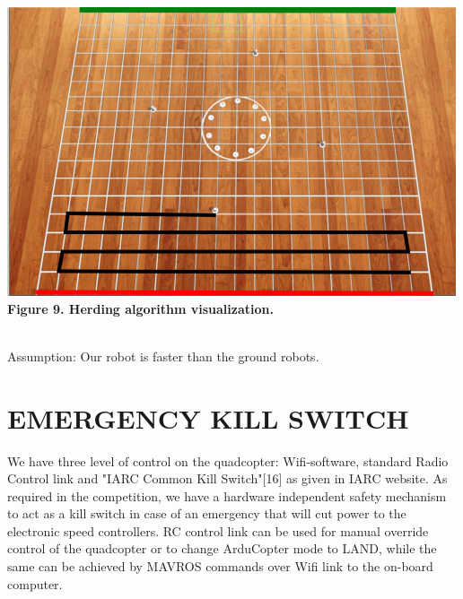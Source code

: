 \documentclass[12pt]{article}
\begin{document}
\begin{center}\includegraphics[scale=0.7]{image28} \\
\textbf{Figure 9. Herding algorithm visualization.}\end{center}\\
Assumption: Our robot is faster than the ground robots.

\section{EMERGENCY KILL SWITCH}
We have three level of control on the quadcopter: Wifi-software, standard Radio Control link and "IARC Common Kill Switch"[16] as given in IARC website.
As required in the competition, we have a hardware independent safety mechanism to act as a kill switch in case of an emergency that will cut power
to the electronic speed controllers. RC control link can be used for manual override control of the quadcopter or to change ArduCopter mode to LAND, while the same can be achieved by MAVROS commands over Wifi link to the on-board computer. 
\end{document}
